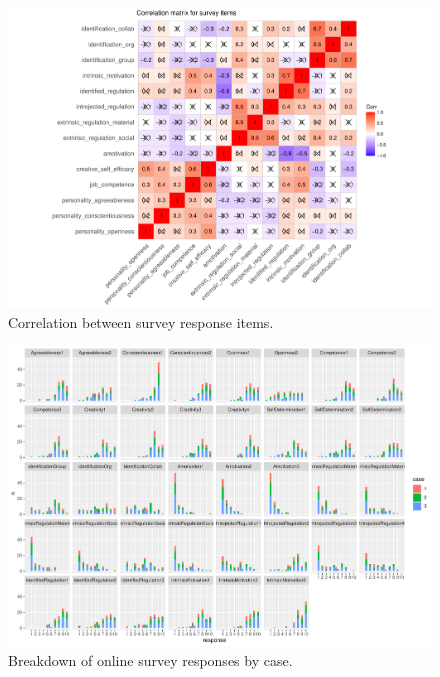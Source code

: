 \begin{figure}
    \centering
    \includegraphics[width = \textwidth]{Images/corr_plot.pdf}
    \caption{Correlation between survey response items.}
    \label{fig:corr_plot}
\end{figure}



\begin{figure}
    \centering
    \includegraphics{Images/survey_scale_responses.pdf}
    \caption{Breakdown of online survey responses by case.}
    \label{fig:survey_response}
\end{figure}
